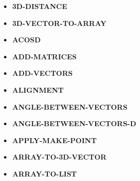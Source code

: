 \documentclass [11pt]{book}
\begin{document}
\label{subsec:functionandmacrodefinitions}



\begin{itemize}

\item {}
\textbf{3D-DISTANCE}





\item {}
\textbf{3D-VECTOR-TO-ARRAY}





\item {}
\textbf{ACOSD}





\item {}
\textbf{ADD-MATRICES}





\item {}
\textbf{ADD-VECTORS}





\item {}
\textbf{ALIGNMENT}





\item {}
\textbf{ANGLE-BETWEEN-VECTORS}





\item {}
\textbf{ANGLE-BETWEEN-VECTORS-D}





\item {}
\textbf{APPLY-MAKE-POINT}





\item {}
\textbf{ARRAY-TO-3D-VECTOR}





\item {}
\textbf{ARRAY-TO-LIST}






\end{itemize}
\end{document}
